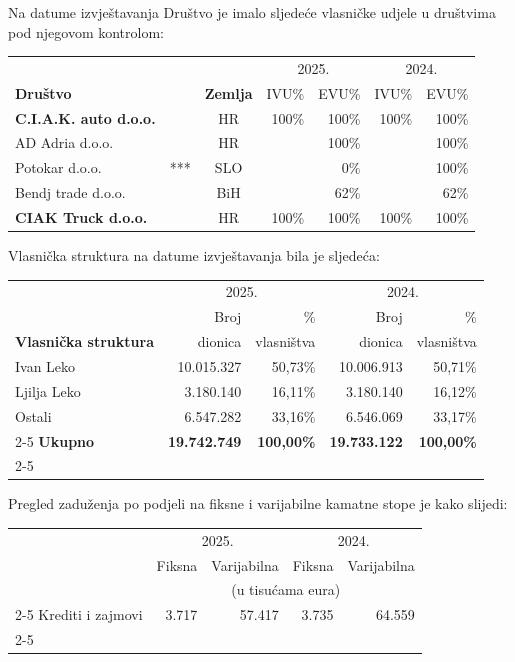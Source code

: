 \documentclass[a4paper,10pt]{article}
\begin{document}
Na datume izvještavanja Društvo je imalo sljedeće vlasničke udjele u društvima pod njegovom kontrolom:

\vspace{1em}
{\small
\begin{tabular}{@{}p{5cm}p{1cm}crrrr@{}}
 & & & \multicolumn{2}{c}{2025.} & \multicolumn{2}{c}{2024.} \\
\textbf{Društvo} & & \textbf{Zemlja} & IVU\% & EVU\% & IVU\% & EVU\% \\ \hline
\textbf{C.I.A.K. auto d.o.o.} & & HR & 100\% & 100\% & 100\% & 100\% \\
\quad AD Adria d.o.o. & & HR & & 100\% & & 100\% \\
\quad Potokar d.o.o. & *** & SLO & & 0\% & & 100\% \\
\quad Bendj trade d.o.o. & & BiH & & 62\% & & 62\% \\
\textbf{CIAK Truck d.o.o.} & & HR & 100\% & 100\% & 100\% & 100\% \\
\end{tabular}}

\vspace{3em}
Vlasnička struktura na datume izvještavanja bila je sljedeća:

\vspace{1em}
{\small
\begin{tabular}{@{}p{4cm}rrrr@{}}
 & \multicolumn{2}{c}{2025.} & \multicolumn{2}{c}{2024.} \\
 & Broj & \% & Broj & \% \\
\textbf{Vlasnička struktura} & dionica & vlasništva & dionica & vlasništva \\
Ivan Leko & 10.015.327 & 50,73\% & 10.006.913 & 50,71\% \\
Ljilja Leko & 3.180.140 & 16,11\% & 3.180.140 & 16,12\% \\
Ostali & 6.547.282 & 33,16\% & 6.546.069 & 33,17\% \\ \cline{2-5}
\textbf{Ukupno} & \textbf{19.742.749} & \textbf{100,00\%} & \textbf{19.733.122} & \textbf{100,00\%} \\ \cline{2-5}
\end{tabular}}

\vspace{3em}
Pregled zaduženja po podjeli na fiksne i varijabilne kamatne stope je kako slijedi:

\vspace{1em}
{\small
\begin{tabular}{@{}p{4cm}rrrr@{}}
 & \multicolumn{2}{c}{2025.} & \multicolumn{2}{c}{2024.} \\
 & Fiksna & Varijabilna & Fiksna & Varijabilna \\
 & \multicolumn{4}{c}{(u tisućama eura)} \\ \cline{2-5}
Krediti i zajmovi & 3.717 & 57.417 & 3.735 & 64.559 \\ \cline{2-5}
\end{tabular}}
\end{document}
